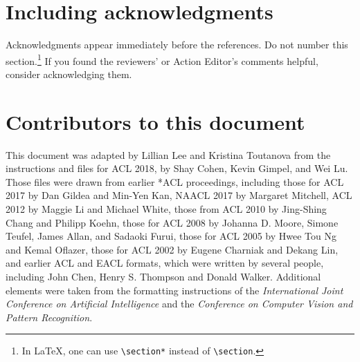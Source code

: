 \documentclass[11pt,a4paper]{article}
\begin{document}
\iftaclpubformat

\section{Including acknowledgments}
Acknowledgments appear immediately before the references.  Do not number this
section.\footnote{In \LaTeX, one can use {\tt {\textbackslash}section*} instead
of {\tt {\textbackslash}section}.} If you found the reviewers' or Action
Editor's comments helpful, consider acknowledging them.
\else
\fi

\section{Contributors to this document}
\label{sec:contributors}

This document was adapted by Lillian Lee and Kristina Toutanova
from the instructions and files for ACL 2018, by Shay Cohen, Kevin Gimpel, and
Wei Lu. Those files were drawn from earlier *ACL proceedings, including those
for ACL 2017 by Dan Gildea and Min-Yen Kan, NAACL 2017 by Margaret Mitchell,
ACL 2012 by Maggie Li and Michael White, those from ACL 2010 by Jing-Shing
Chang and Philipp Koehn, those for ACL 2008 by Johanna D. Moore, Simone
Teufel, James Allan, and Sadaoki Furui, those for ACL 2005 by Hwee Tou Ng and
Kemal Oflazer, those for ACL 2002 by Eugene Charniak and Dekang Lin, and
earlier ACL and EACL formats,  which were written by several people,
including John Chen, Henry S. Thompson and Donald Walker. Additional elements
were taken from the formatting instructions of the {\em International Joint
Conference on Artificial   Intelligence} and the \emph{Conference on Computer
Vision and Pattern Recognition}.




\end{document}

